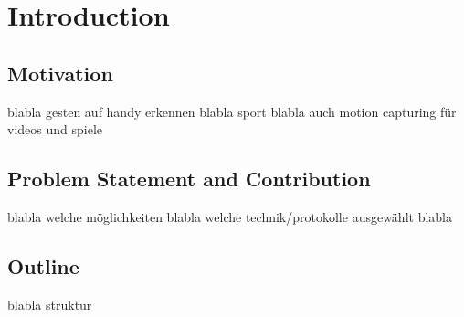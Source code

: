 \chapter{Introduction}

\section{Motivation}
blabla gesten auf handy erkennen blabla sport blabla auch motion capturing für videos und spiele 

\section{Problem Statement and Contribution}
blabla welche möglichkeiten blabla welche technik/protokolle ausgewählt blabla

\section{Outline}
blabla struktur